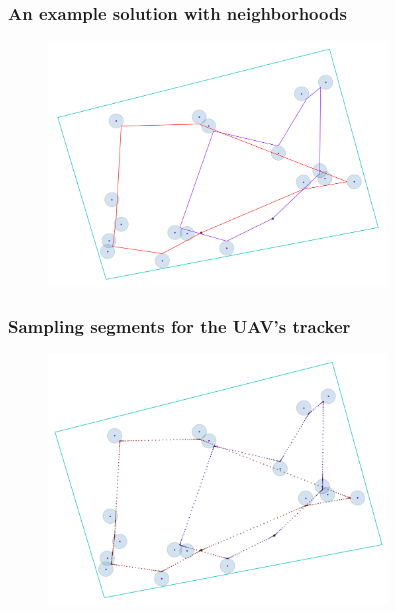 \documentclass[aspectratio=1610]{beamer}
\begin{document}
\begin{frame}
  \frametitle{An example solution with neighborhoods}

  \begin{figure}
    \includegraphics[width=0.8\textwidth]{./fig/tsp_segments.png}
  \end{figure}

\end{frame}

\begin{frame}
  \frametitle{Sampling segments for the UAV's tracker}

  \begin{figure}
    \includegraphics[width=0.8\textwidth]{./fig/tsp_segments_sampled.png}
  \end{figure}

\end{frame}
\end{document}
